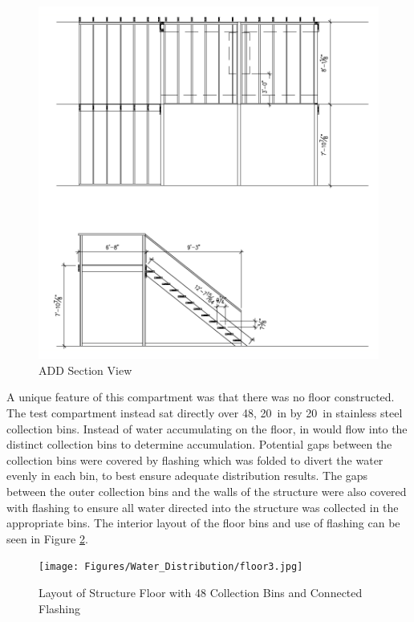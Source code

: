 \documentclass{book}
\begin{document}
\begin{figure}[!ht]
	\centering
	\includegraphics[width=\columnwidth]{Figures/Water_Distribution/ADDsideviewprint}
	\caption{ADD Section View}
	\label{fig:ADD_Side_View}
\end{figure}

\clearpage

A unique feature of this compartment was that there was no floor constructed. The test compartment instead sat directly over 48, 20~in by 20~in stainless steel collection bins. Instead of water accumulating on the floor, in would flow into the distinct collection bins to determine accumulation. Potential gaps between the collection bins were covered by flashing which was folded to divert the water evenly in each bin, to best ensure adequate distribution results. The gaps between the outer collection bins and the walls of the structure were also covered with flashing to ensure all water directed into the structure was collected in the appropriate bins. The interior layout of the floor bins and use of flashing can be seen in Figure \ref{fig:ADD_Flashing}. 

\begin{figure}[!ht]
	\centering
	\texttt{[image: Figures/Water\_Distribution/floor3.jpg]}
	\caption{Layout of Structure Floor with 48 Collection Bins and Connected Flashing}
	\label{fig:ADD_Flashing}
\end{figure}
\end{document}

